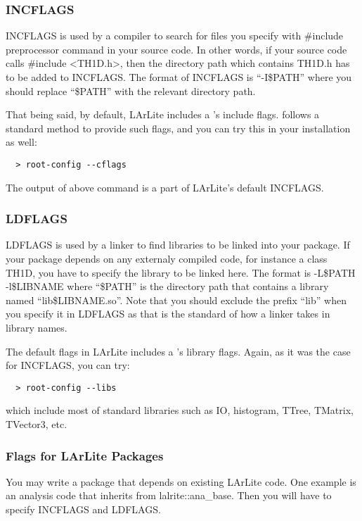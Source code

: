 \subsubsection{INCFLAGS}
{\ttfamily INCFLAGS} is used by a compiler to search for files you specify with {\ttfamily \#include} preprocessor command in your source code.
In other words, if your source code calls {\ttfamily \#include <TH1D.h>}, then the directory path which contains {\ttfamily TH1D.h} has to be
added to {\ttfamily INCFLAGS}. The format of {\ttfamily INCFLAGS} is ``-I\$PATH'' where you should replace ``\$PATH'' with the relevant
directory path.

That being said, by default, LArLite includes a \ROOT's include flags.
\ROOT follows a standard method to provide such flags, and you can try this in your installation as well:
\begin{lstlisting}
  > root-config --cflags
\end{lstlisting}
The output of above command is a part of LArLite's default {\ttfamily INCFLAGS}.

\subsubsection{LDFLAGS}
{\ttfamily LDFLAGS} is used by a linker to find libraries to be linked into your package. If your package depends on any externaly compiled
code, for instance a \ROOT class {\ttfamily TH1D}, you have to specify the library to be linked here. The format is 
{\ttfamily -L\$PATH -l\$LIBNAME} where ``\$PATH'' is the directory path that contains a library named ``lib\$LIBNAME.so''. Note that
you should exclude the prefix ``lib'' when you specify it in {\ttfamily LDFLAGS} as that is the standard of how a linker takes in library names.

The default flags in LArLite includes a \ROOT's library flags.
Again, as it was the case for {\ttfamily INCFLAGS}, you can try:
\begin{lstlisting}
  > root-config --libs
\end{lstlisting}
which include most of standard \ROOT libraries such as IO, histogram, TTree, TMatrix, TVector3, etc.

\subsubsection{Flags for LArLite Packages}
You may write a package that depends on existing LArLite code.
One example is an analysis code that inherits from {\ttfamily lalrite::ana\_base}. 
Then you will have to specify {\ttfamily INCFLAGS} and {\ttfamily LDFLAGS}.

